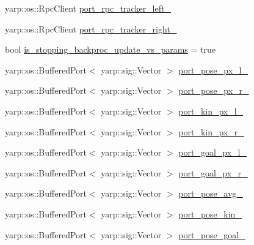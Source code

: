 \begin{DoxyCompactItemize}
\item 
yarp\+::os\+::\+Rpc\+Client \hyperlink{classVisualServoingServer_a3835afd8ec4c21b2c1d217f7d68a71bb}{port\+\_\+rpc\+\_\+tracker\+\_\+left\+\_\+}
\item 
yarp\+::os\+::\+Rpc\+Client \hyperlink{classVisualServoingServer_a36df02520e7cc2814d8404e05a42409b}{port\+\_\+rpc\+\_\+tracker\+\_\+right\+\_\+}
\item 
bool \hyperlink{classVisualServoingServer_a36243aeb865e36c5e91d3cd3375b9f29}{is\+\_\+stopping\+\_\+backproc\+\_\+update\+\_\+vs\+\_\+params} = true
\item 
yarp\+::os\+::\+Buffered\+Port$<$ yarp\+::sig\+::\+Vector $>$ \hyperlink{classVisualServoingServer_aa72393af28f4b424eeb2966962cbd319}{port\+\_\+pose\+\_\+px\+\_\+l\+\_\+}
\item 
yarp\+::os\+::\+Buffered\+Port$<$ yarp\+::sig\+::\+Vector $>$ \hyperlink{classVisualServoingServer_ab068de8542a539175a18d698e5b2289f}{port\+\_\+pose\+\_\+px\+\_\+r\+\_\+}
\item 
yarp\+::os\+::\+Buffered\+Port$<$ yarp\+::sig\+::\+Vector $>$ \hyperlink{classVisualServoingServer_a5c6969762a136abeb5de050637e6fbc7}{port\+\_\+kin\+\_\+px\+\_\+l\+\_\+}
\item 
yarp\+::os\+::\+Buffered\+Port$<$ yarp\+::sig\+::\+Vector $>$ \hyperlink{classVisualServoingServer_a0a681791d720678229a3365a5bb0bfd6}{port\+\_\+kin\+\_\+px\+\_\+r\+\_\+}
\item 
yarp\+::os\+::\+Buffered\+Port$<$ yarp\+::sig\+::\+Vector $>$ \hyperlink{classVisualServoingServer_ac4fad3f3691ad57d8a1f693e573f75be}{port\+\_\+goal\+\_\+px\+\_\+l\+\_\+}
\item 
yarp\+::os\+::\+Buffered\+Port$<$ yarp\+::sig\+::\+Vector $>$ \hyperlink{classVisualServoingServer_ad06d05e912dbba4c1ded31ae6e0e3004}{port\+\_\+goal\+\_\+px\+\_\+r\+\_\+}
\item 
yarp\+::os\+::\+Buffered\+Port$<$ yarp\+::sig\+::\+Vector $>$ \hyperlink{classVisualServoingServer_a31db93e3ee0db64e8681d762428b85a9}{port\+\_\+pose\+\_\+avg\+\_\+}
\item 
yarp\+::os\+::\+Buffered\+Port$<$ yarp\+::sig\+::\+Vector $>$ \hyperlink{classVisualServoingServer_a0f4787672f7b6dea128d688aff2056fc}{port\+\_\+pose\+\_\+kin\+\_\+}
\item 
yarp\+::os\+::\+Buffered\+Port$<$ yarp\+::sig\+::\+Vector $>$ \hyperlink{classVisualServoingServer_a73e57c16019ed76e14e92a600f1e761b}{port\+\_\+pose\+\_\+goal\+\_\+}
\end{DoxyCompactItemize}



